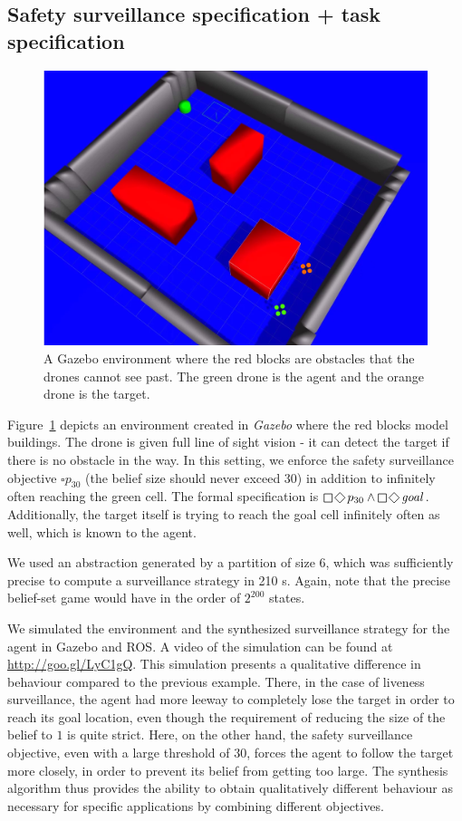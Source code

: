 \subsection{Safety surveillance specification + task specification}
\begin{figure}
\centering
\includegraphics[scale=0.13]{figs/ROS_fig.png}\caption{A Gazebo environment where the red blocks are obstacles that the drones cannot see past. The green drone is the agent and the orange drone is the target.}\label{fig:case2}
\vspace{-.5cm}
\end{figure}
Figure~\ref{fig:case2} depicts an environment created in \emph{Gazebo} where the red blocks model buildings. The drone is given full line of sight vision - it can detect the target if there is no obstacle in the way. 
In this setting, we enforce the safety surveillance objective $\square p_{30}$ (the belief size should never exceed 30) in addition to infinitely often reaching the green cell. The formal specification is $\LTLglobally\LTLfinally p_{30} \wedge \LTLglobally\LTLfinally \mathit{goal}$. Additionally, the target itself is trying to reach the goal cell infinitely often as well, which is known to the agent.

We used an abstraction generated by a partition of size 6, which was sufficiently precise to compute a surveillance strategy in 210 s. Again, note that the precise belief-set game would have in the order of $2^{200}$ states.
 
We simulated the environment and the synthesized surveillance strategy for the agent in Gazebo and ROS. A video of the simulation can be found at \url{http://goo.gl/LyC1gQ}. This simulation presents a qualitative difference in behaviour compared to the previous example. There, in the case of liveness surveillance, the agent had more leeway to completely lose the target in order to reach its goal location, even though the requirement of reducing the size of the belief to $1$ is quite strict. Here, on the other hand, the safety surveillance objective, even with a large threshold of $30$, forces the agent to follow the target more closely, in order to prevent its belief from getting too large. The synthesis algorithm thus provides the ability to obtain qualitatively different behaviour as necessary for specific applications by combining different objectives. 

